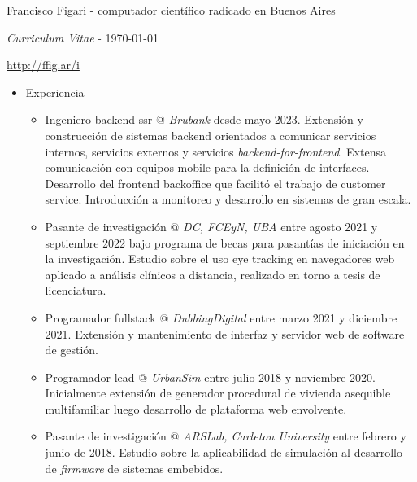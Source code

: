 \documentclass[a4paper]{article}
\begin{document}
\thispagestyle{empty}  %

Francisco Figari - computador científico radicado en Buenos Aires

\textit{Curriculum Vitae} - \monthyeardate\today

\url{http://ffig.ar/i}

\begin{itemize}

  \item Experiencia
  \begin{itemize}
    \item
      Ingeniero backend ssr @ \textit{Brubank} desde mayo 2023. \newline
      Extensión y construcción de sistemas backend orientados a comunicar
      servicios internos, servicios externos y servicios
		  \textit{backend-for-frontend}. \newline
	  Extensa comunicación con equipos mobile para la definición de interfaces.
		  \newline
	  Desarrollo del frontend backoffice que facilitó el trabajo de customer
		  service. \newline
	  Introducción a monitoreo y desarrollo en sistemas de gran escala.

    \item
      Pasante de investigación @ \textit{DC, FCEyN, UBA} entre agosto 2021 y
      septiembre 2022 bajo programa de becas para pasantías de iniciación en
      la investigación. \newline
      Estudio sobre el uso eye tracking en navegadores web aplicado a análisis
      clínicos a distancia, realizado en torno a tesis de licenciatura.

    \item
      Programador fullstack @ \textit{DubbingDigital} entre marzo 2021 y
      diciembre 2021.  \newline
      Extensión y mantenimiento de interfaz y servidor web de software de
      gestión.

    \item
      Programador lead @ \textit{UrbanSim} entre julio 2018 y noviembre 2020.
      \newline
      Inicialmente extensión de generador procedural de vivienda asequible
      multifamiliar luego desarrollo de plataforma web envolvente.

    \item
      Pasante de investigación @ \textit{ARSLab, Carleton University} entre
      febrero y junio de 2018. \newline
      Estudio sobre la aplicabilidad de simulación al desarrollo de
      \textit{firmware} de sistemas embebidos.


\end{itemize}
\end{itemize}
\end{document}
